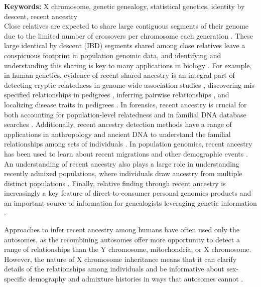 \documentclass[11pt]{article}
\begin{document}
{\small {\bf Keywords:} X chromosome, genetic genealogy, statistical genetics, identity by descent, recent ancestry}\\[1em]

Close relatives are expected to share large contiguous segments of their genome
due to the limited number of crossovers per chromosome each generation
\citep{fisher1949theory,fisher1954fuller,Donnelly:1983fi}. These large
identical by descent (IBD) segments shared among close relatives leave a
conspicuous footprint in population genomic data, and identifying and
understanding this sharing is key to many applications in biology
\citep{thompson2013identity}. For example, in human genetics, evidence of
recent shared ancestry is an integral part of detecting cryptic relatedness in
genome-wide association studies \citep{gusev2009whole}, discovering
mis-specified relationships in pedigrees \citep{sun2002enhanced}, inferring
pairwise relationships \citep{Epstein:2000b, glaubitz2003prospects,
huff2011maximum}, and localizing disease traits in pedigrees
\citep{thomas2008shared}. In forensics, recent ancestry is crucial for both
accounting for population-level relatedness \citep{balding1994dna} and in
familial DNA database searches \citep{belin1997summarizing,
sjerps1999consequences}. Additionally, recent ancestry detection methods have a
range of applications in anthropology and ancient DNA to understand the
familial relationships among sets of individuals
\citep{Fu:2015bl,keyser2003nuclear,baca2012ancient,haak2008ancient}. In
population genomics, recent ancestry has been used to learn about recent
migrations and other demographic events
\citep{ralphcoop2013,palamara2012length}. An understanding of recent ancestry
also plays a large role in understanding recently admixed populations, where
individuals draw ancestry from multiple distinct populations
\citep{pool2009inference,Gravel:2012ip,Liang:2014fo}. Finally, relative finding
through recent ancestry is increasingly a key feature of direct-to-consumer
personal genomics products and an important source of information for
genealogists leveraging genetic information
\citep{Durand010512,royal2010inferring}. 

Approaches to infer recent ancestry among humans have often used only the
autosomes, as the recombining autosomes offer more opportunity to detect a
range of relationships than the Y chromosome, mitochondria, or X chromosome.
However, the nature of X chromosome inheritance means that it can clarify
details of the relationships among individuals and be informative about
sex-specific demography and admixture histories in ways that autosomes cannot
\citep{Goldberg:2015ja,ramachandran2004robustness,
ramachandran2008population,bryc2010genome,Bustamante:2009gp,Shringarpure039347,pool2007population}.
\end{document}
